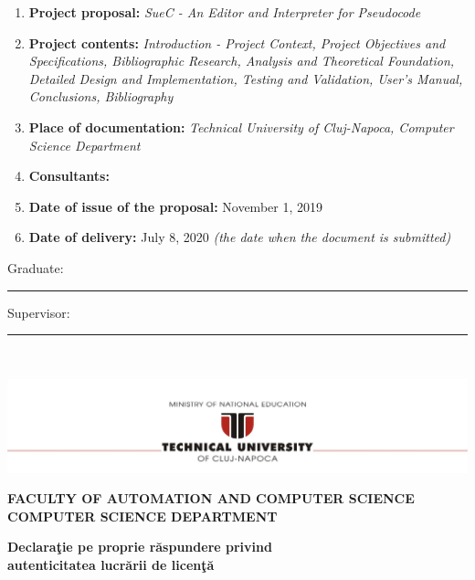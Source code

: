 \documentclass[12pt,a4paper,twoside]{report}
\newcommand{\department}{\bf FACULTY OF AUTOMATION AND COMPUTER SCIENCE\\
COMPUTER SCIENCE DEPARTMENT}
\newcommand{\utcnlogo}{\includegraphics[width=15cm]{img/tucn.jpg}}
\newcommand{\uline}[1]{\rule[0pt]{#1}{0.4pt}}
\begin{document}
\vspace{1cm}

\begin{enumerate}
 \item {\bf Project proposal:} {\it SueC - An Editor and Interpreter for Pseudocode}
\item {\bf Project contents:} {\it Introduction - Project Context, Project Objectives and Specifications, Bibliographic Research, Analysis and Theoretical Foundation, Detailed Design and Implementation, Testing and Validation, User's Manual, Conclusions, Bibliography}
\item {\bf Place of documentation:} {\it Technical University of Cluj-Napoca, Computer Science Department}
\item {\bf Consultants:}
\item {\bf Date of issue of the proposal:} November 1, 2019
\item {\bf Date of  delivery:} July 8, 2020 {\it (the date when the document is submitted)}
  \end{enumerate}
\vspace{1.2cm}

\hspace{6cm} Graduate: \uline{6cm} 

\vspace{0.5cm}
\hspace{6cm} Supervisor: \uline{6cm} 

\thispagestyle{empty}


\newpage
$ $


\thispagestyle{empty}
\newpage

\begin{center}
\utcnlogo

\department
\end{center}

\vspace{0.5cm}

\begin{center}
{\bf
Declara\c{t}ie pe proprie r\u{a}spundere privind\\ 
autenticitatea lucr\u{a}rii de licen\c{t}\u{a}}
\end{center}
\vspace{1cm}
\end{document}
